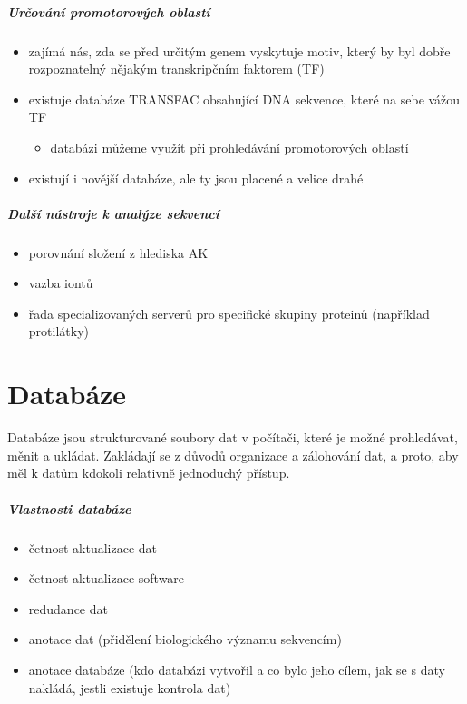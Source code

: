 \documentclass[DIV=8]{scrreprt}
\begin{document}
\paragraph{Určování promotorových oblastí}
\begin{itemize}[nosep]
    \item zajímá nás, zda se před určitým genem vyskytuje motiv, který by byl dobře rozpoznatelný nějakým transkripčním faktorem (TF)
    \item existuje databáze TRANSFAC obsahující DNA sekvence, které na sebe vážou TF
\begin{itemize}[nosep]
    \item databázi můžeme využít při prohledávání promotorových oblastí
\end{itemize}

    \item existují i novější databáze, ale ty jsou placené a velice drahé
\end{itemize}



\paragraph{Další nástroje k analýze sekvencí}
\begin{itemize}[nosep]
    \item porovnání složení z hlediska AK
    \item vazba iontů
    \item řada specializovaných serverů pro specifické skupiny proteinů (například protilátky)
\end{itemize}



\chapter{Databáze} \label{Databáze}


Databáze jsou strukturované soubory dat v počítači, které je možné prohledávat, měnit a ukládat. Zakládají se z důvodů organizace a zálohování dat, a proto, aby měl k datům kdokoli relativně jednoduchý přístup.

\paragraph{Vlastnosti databáze}
\begin{itemize}[nosep]
    \item četnost aktualizace dat
    \item četnost aktualizace software
    \item redudance dat
    \item anotace dat (přidělení biologického významu sekvencím)
    \item anotace databáze (kdo databázi vytvořil a co bylo jeho cílem, jak se s daty nakládá, jestli existuje kontrola dat)
\end{itemize}
\end{document}
